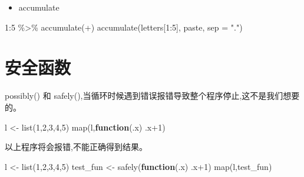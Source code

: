 \documentclass[
]{book}
\newenvironment{Shaded}{\begin{snugshade}}{\end{snugshade}}
\newcommand{\AttributeTok}[1]{\textcolor[rgb]{0.77,0.63,0.00}{#1}}
\newcommand{\ControlFlowTok}[1]{\textcolor[rgb]{0.13,0.29,0.53}{\textbf{#1}}}
\newcommand{\DecValTok}[1]{\textcolor[rgb]{0.00,0.00,0.81}{#1}}
\newcommand{\FunctionTok}[1]{\textcolor[rgb]{0.00,0.00,0.00}{#1}}
\newcommand{\NormalTok}[1]{#1}
\newcommand{\OtherTok}[1]{\textcolor[rgb]{0.56,0.35,0.01}{#1}}
\newcommand{\SpecialCharTok}[1]{\textcolor[rgb]{0.00,0.00,0.00}{#1}}
\newcommand{\StringTok}[1]{\textcolor[rgb]{0.31,0.60,0.02}{#1}}
\providecommand{\tightlist}{%
  \setlength{\itemsep}{0pt}\setlength{\parskip}{0pt}}
\begin{document}
\begin{itemize}
\tightlist
\item
  accumulate
\end{itemize}

\begin{Shaded}
\begin{Highlighting}[]
\DecValTok{1}\SpecialCharTok{:}\DecValTok{5} \SpecialCharTok{\%\textgreater{}\%} \FunctionTok{accumulate}\NormalTok{(}\StringTok{\textasciigrave{}}\AttributeTok{+}\StringTok{\textasciigrave{}}\NormalTok{)}
\FunctionTok{accumulate}\NormalTok{(letters[}\DecValTok{1}\SpecialCharTok{:}\DecValTok{5}\NormalTok{], paste, }\AttributeTok{sep =} \StringTok{"."}\NormalTok{)}
\end{Highlighting}
\end{Shaded}

\hypertarget{ux5b89ux5168ux51fdux6570}{%
\section{安全函数}\label{ux5b89ux5168ux51fdux6570}}

possibly() 和 safely(),当循环时候遇到错误报错导致整个程序停止,这不是我们想要的。

\begin{Shaded}
\begin{Highlighting}[]
\NormalTok{l }\OtherTok{\textless{}{-}} \FunctionTok{list}\NormalTok{(}\DecValTok{1}\NormalTok{,}\DecValTok{2}\NormalTok{,}\DecValTok{3}\NormalTok{,}\DecValTok{4}\NormalTok{,}\StringTok{\textquotesingle{}5\textquotesingle{}}\NormalTok{)}
\FunctionTok{map}\NormalTok{(l,}\ControlFlowTok{function}\NormalTok{(.x) .x}\SpecialCharTok{+}\DecValTok{1}\NormalTok{)}
\end{Highlighting}
\end{Shaded}

以上程序将会报错,不能正确得到结果。

\begin{Shaded}
\begin{Highlighting}[]
\NormalTok{l }\OtherTok{\textless{}{-}} \FunctionTok{list}\NormalTok{(}\DecValTok{1}\NormalTok{,}\DecValTok{2}\NormalTok{,}\DecValTok{3}\NormalTok{,}\DecValTok{4}\NormalTok{,}\StringTok{\textquotesingle{}5\textquotesingle{}}\NormalTok{)}
\NormalTok{test\_fun }\OtherTok{\textless{}{-}} \FunctionTok{safely}\NormalTok{(}\ControlFlowTok{function}\NormalTok{(.x) .x}\SpecialCharTok{+}\DecValTok{1}\NormalTok{)}
\FunctionTok{map}\NormalTok{(l,test\_fun)}
\end{Highlighting}
\end{Shaded}
\end{document}
